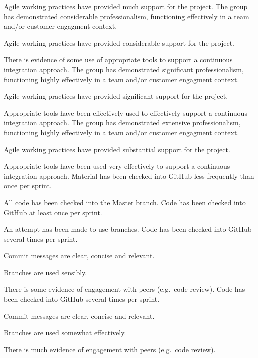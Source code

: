 \documentclass{../fal_assignment}
\begin{document}
\begin{markingrubric}
            \par Agile working practices have provided much support for the project.
        \grade The group has demonstrated considerable professionalism,
            functioning effectively in a team and/or customer engagment context.
            \par Agile working practices have provided considerable support for the project.
            \par There is evidence of some use of appropriate tools to support a continuous integration approach.
        \grade The group has demonstrated significant professionalism,
            functioning highly effectively in a team and/or customer engagment context.
            \par Agile working practices have provided significant support for the project.
            \par Appropriate tools have been effectively used to effectively support a continuous integration approach.
        \grade The group has demonstrated extensive professionalism,
            functioning highly effectively in a team and/or customer engagment context.
            \par Agile working practices have provided substantial support for the project.
            \par Appropriate tools have been used very effectively to support a continuous integration approach.
%
        \grade \fail Material has been checked into GitHub less frequently than once per sprint.
            \par All code has been checked into the Master branch.
        \grade Code has been checked into GitHub at least once per sprint.
            \par An attempt has been made to use branches.
        \grade Code has been checked into GitHub several times per sprint.
            \par Commit messages are clear, concise and relevant.
            \par Branches are used sensibly.
            \par There is some evidence of engagement with peers (e.g.\ code review).
        \grade Code has been checked into GitHub several times per sprint.
            \par Commit messages are clear, concise and relevant.
            \par Branches are used somewhat effectively.
            \par There is much evidence of engagement with peers (e.g.\ code review).

\end{markingrubric}
\end{document}
